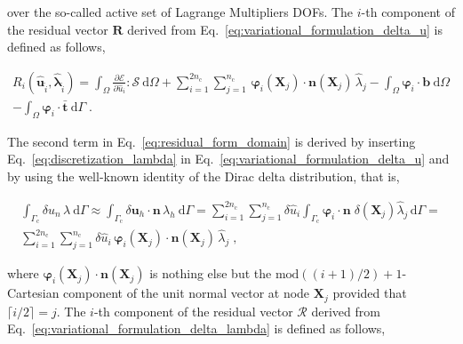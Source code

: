 \documentclass[10pt,a4paper]{article}
\begin{document}
over the so-called active set of Lagrange Multipliers DOFs. The $i$-th component of the residual vector $\mathbf{R}$ derived from Eq.~\eqref{eq:variational_formulation_delta_u} is defined as follows,

\begin{equation}
	\begin{split}
	R_i ( \hat{\mathbf{u}}_{\hat{i}} , \hat{\boldsymbol{\lambda}}_{\hat{i}} ) = \int_{\Omega} \frac{\partial \boldsymbol{\mathcal{E}}}{\partial \hat{u}_i} : \boldsymbol{\mathcal{S}} \: \text{d} \Omega + \sum_{i = 1}^{2 n_{\text{c}}} \sum_{j = 1}^{n_{\text{c}}} \, \boldsymbol{\varphi}_i (\mathbf{X}_j) \cdot \mathbf{n}(\mathbf{X}_j) \, \hat{\lambda}_j - \int_{\Omega} \boldsymbol{\varphi}_i \cdot \mathbf{b} \: \text{d} \Omega \\
	- \int_{\Omega} \boldsymbol{\varphi}_i \cdot \bar{\mathbf{t}} \: \text{d} \Gamma \;.
	\end{split} 
	\label{eq:residual_form_domain}
\end{equation}

The second term in Eq.~\eqref{eq:residual_form_domain} is derived by inserting Eq.~\eqref{eq:discretization_lambda} in Eq.~\eqref{eq:variational_formulation_delta_u} and by using the well-known identity of the Dirac delta distribution, that is,

\begin{equation}
	\begin{split}
	\int_{\Gamma_{\text{c}}} \delta u_n \, \lambda \: \text{d} \Gamma \approx \int_{\Gamma_{\text{c}}} \delta \mathbf{u}_h \cdot \mathbf{n} \, \lambda_h \: \text{d} \Gamma = \sum_{i = 1}^{2 n_{\text{c}}} \sum_{j = 1}^{n_{\text{c}}} \delta \hat{u}_i \int_{\Gamma_{\text{c}}} \boldsymbol{\varphi}_i \cdot \mathbf{n} \; \delta (\mathbf{X}_j) \hat{\lambda}_j  \, \text{d} \Gamma = \\
	\sum_{i = 1}^{2 n_{\text{c}}} \sum_{j = 1}^{n_{\text{c}}} \delta \hat{u}_i \, \boldsymbol{\varphi}_i (\mathbf{X}_j) \cdot \mathbf{n}(\mathbf{X}_j) \, \hat{\lambda}_j \;,
	\end{split} 
	\label{eq:discretization_complementarity}
\end{equation}

where $\boldsymbol{\varphi}_i (\mathbf{X}_j) \cdot \mathbf{n}(\mathbf{X}_j)$ is nothing else but the $\text{mod}\left( (i + 1)/2 \right) + 1$-Cartesian component of the unit normal vector at node $\mathbf{X}_j$ provided that $\lceil i/2 \rceil = j$. The $i$-th component of the residual vector $\boldsymbol{\mathcal{R}}$ derived from Eq.~\eqref{eq:variational_formulation_delta_lambda} is defined as follows,
\end{document}
